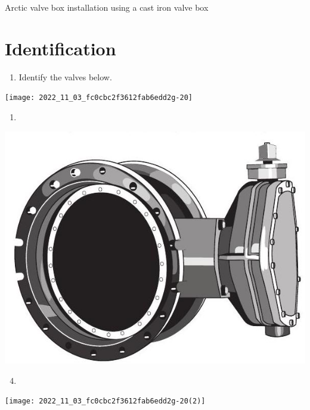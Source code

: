 \documentclass[10pt]{article}
\begin{document}
Arctic valve box installation using a cast iron valve box

\section{Identification}
\begin{enumerate}
  \item Identify the valves below.
\end{enumerate}
\texttt{[image: 2022\_11\_03\_fc0cbc2f3612fab6edd2g-20]}

\begin{enumerate}
  \item 
\end{enumerate}
\includegraphics[max width=\textwidth]{2022_11_03_fc0cbc2f3612fab6edd2g-20(1)}

\begin{enumerate}
  \setcounter{enumi}{3}
  \item 
\end{enumerate}
\texttt{[image: 2022\_11\_03\_fc0cbc2f3612fab6edd2g-20(2)]}
\end{document}
